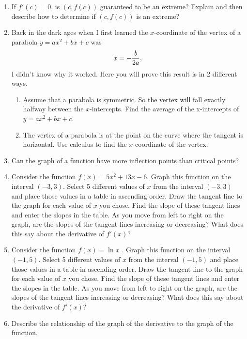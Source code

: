\begin{enumerate}
\item  If $f'(c) = 0$, is $(c, f(c))$ guaranteed to be an extreme?   Explain and then describe how to determine if $(c, f(c))$ is an extreme?  

\item  Back in the dark ages when I first learned the $x$-coordinate of the vertex of a parabola 
$y = ax^2 + bx + c$ was $$x =  - {b \over {2a}},$$ I didn't know why it worked.  Here you will prove this result is in 2 different ways.

\begin{enumerate}
	\item Assume that a parabola is symmetric.  So the vertex will fall exactly halfway between the $x$-intercepts.  Find the average of the x-intercepts of $y = ax^2 + bx + c$.  
	\item The vertex of a parabola is at the point on the curve where the tangent is horizontal.  Use calculus to find the $x$-coordinate of the vertex.
\end{enumerate}


\item  Can the graph of a function have more inflection points than critical points?  \cite{EP}

\item  Consider the function $f(x) = 5x^2	+ 13x - 6$.  Graph this function on the interval $(-3, 3)$.  Select 5 different values of $x$ from the interval $(-3, 3)$ and place those values in a table in ascending order.  Draw the tangent line to the graph for each value of $x$ you chose.  Find the slope of these tangent lines and enter the slopes in the table.  As you move from left to right on the graph, are the slopes of the tangent lines increasing or decreasing?  What does this say about the derivative of $f'(x)?$    

\item  Consider the function $f(x) = \ln x$ . Graph this function on the interval $(-1, 5)$. Select 5 different values of $x$ from the interval $(-1, 5)$ and place those values in a table in ascending order.  Draw the tangent line to the graph for each value of $x$ you chose.  Find the slope of these tangent lines and enter the slopes in the table.  As you move from left to right on the graph, are the slopes of the tangent lines increasing or decreasing?  What does this say about the derivative of $f'(x)?$

\item  Describe the relationship of the graph of the derivative to the graph of the function. \cite{SBS}


\end{enumerate}
